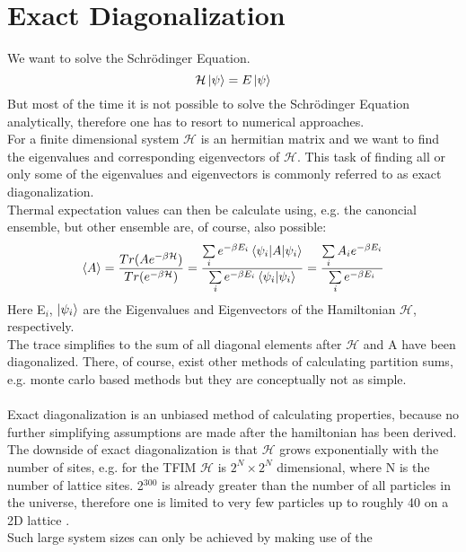 \documentclass{article}
\begin{document}
\section{Exact Diagonalization}
We want to solve the Schr\"odinger Equation.
\begin{equation}
\label{eq:1}
\mathcal{H} \ket{\psi} = E \ket{\psi}
\end{equation}
But most of the time it is not possible to solve the Schr\"odinger
Equation analytically, therefore one has to resort to numerical
approaches.\\
For a finite dimensional system $\mathcal{H}$ is an hermitian matrix
and we want to find the eigenvalues and corresponding eigenvectors of $\mathcal{H}$.
This task of finding all or only some of the eigenvalues and
eigenvectors is commonly referred to as exact diagonalization.\\
Thermal expectation values can then be calculate using, e.g. the
canoncial ensemble, but other ensemble are, of course, also possible:
\begin{equation}
\label{eq:2}
\braket{A} = \frac{Tr(Ae^{-\beta \mathcal H})}{Tr(e^{-\beta \mathcal
    H})} = \frac{\sum\limits_i e^{-\beta
      E_{i}} \braket{\psi_i|A|\psi_{i}}}{\sum\limits_i e^{-\beta
      E_i} \braket{\psi_i|\psi_{i}}} = \frac{\sum\limits_i A_i e^{-\beta
      E_{i}}}{\sum\limits_i e^{-\beta
      E_i}}
\end{equation}
Here E$_{i}$, $\ket{\psi_i}$ are the Eigenvalues and  Eigenvectors of the Hamiltonian $\mathcal{H}$, respectively.\\
The trace simplifies to the sum of all diagonal elements after
$\mathcal{H}$ and A have been diagonalized. There, of course, exist other methods
of calculating partition sums, e.g. monte carlo based methods but they
are conceptually not as simple.\\
\\
Exact diagonalization is an unbiased method of calculating properties,
because no further simplifying assumptions are made after the
hamiltonian has been derived.\\
The downside of exact diagonalization is that $\mathcal{H}$ grows
exponentially with the number of sites, e.g. for the TFIM
$\mathcal{H}$ is $2^N \times 2^N$ dimensional, where N is the number
of lattice sites. 2$^{300}$ is already greater than the number of all particles in the universe, therefore one is limited to very
few particles up to roughly 40 on a 2D lattice \cite{Noack}.\\
Such large system sizes can only be achieved by making use of the
\end{document}
